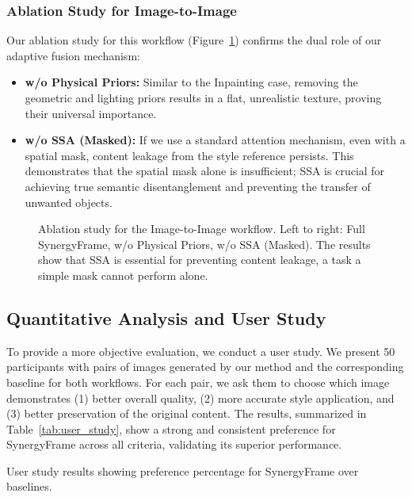 \documentclass[letterpaper]{article} %
\begin{document}
\subsubsection{Ablation Study for Image-to-Image}
Our ablation study for this workflow (Figure~\ref{fig:img2img_ablation}) confirms the dual role of our adaptive fusion mechanism:
\begin{itemize}
    \item \textbf{w/o Physical Priors:} Similar to the Inpainting case, removing the geometric and lighting priors results in a flat, unrealistic texture, proving their universal importance.
    \item \textbf{w/o SSA (Masked):} If we use a standard attention mechanism, even with a spatial mask, content leakage from the style reference persists. This demonstrates that the spatial mask alone is insufficient; SSA is crucial for achieving true semantic disentanglement and preventing the transfer of unwanted objects.
\end{itemize}

\begin{figure}[h]
  \centering
  \caption{Ablation study for the Image-to-Image workflow. Left to right: Full SynergyFrame, w/o Physical Priors, w/o SSA (Masked). The results show that SSA is essential for preventing content leakage, a task a simple mask cannot perform alone.}
  \label{fig:img2img_ablation}
\end{figure}

\subsection{Quantitative Analysis and User Study}
To provide a more objective evaluation, we conduct a user study. We present 50 participants with pairs of images generated by our method and the corresponding baseline for both workflows. For each pair, we ask them to choose which image demonstrates (1) better overall quality, (2) more accurate style application, and (3) better preservation of the original content. The results, summarized in Table~\ref{tab:user_study}, show a strong and consistent preference for SynergyFrame across all criteria, validating its superior performance.

\begin{table}[h]
  \centering
  \caption{User study results showing preference percentage for SynergyFrame over baselines.}
  \label{tab:user_study}
\end{table}
\end{document}

